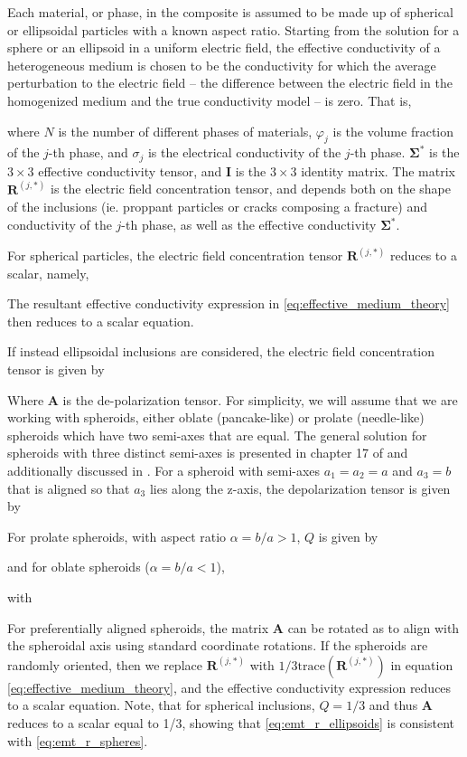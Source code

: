 Each material, or phase, in the composite is assumed to be made up of spherical or ellipsoidal particles with a known aspect ratio. Starting from the solution for a sphere or an ellipsoid in a uniform electric field, the effective conductivity of a heterogeneous medium is chosen to be the conductivity for which the average perturbation to the electric field -- the difference between the electric field in the homogenized medium and the true conductivity model -- is zero. That is,

where $N$ is the number of different phases of materials, $\varphi_j$ is the volume fraction of the $j$-th phase, and $\sigma_j$ is the electrical conductivity of the $j$-th phase. $\boldsymbol{\Sigma^*}$ is the $3 \times 3$ effective conductivity tensor, and $\mathbf{I}$ is the $3 \times 3$ identity matrix. The matrix $\mathbf{R}^{(j,*)}$ is the electric field concentration tensor, and depends both on the shape of the inclusions (ie. proppant particles or cracks composing a fracture) and conductivity of the $j$-th phase, as well as the effective conductivity $\boldsymbol{\Sigma^*}$.

For spherical particles, the electric field concentration tensor $\mathbf{R}^{(j,*)}$ reduces to a scalar, namely,

The resultant effective conductivity expression in \ref{eq:effective_medium_theory} then reduces to a scalar equation.

If instead ellipsoidal inclusions are considered, the electric field concentration tensor is given by

Where $\mathbf{A}$ is the de-polarization tensor. For simplicity, we will assume that we are working with spheroids, either oblate (pancake-like) or prolate (needle-like) spheroids which have two semi-axes that are equal. The general solution for spheroids with three distinct semi-axes is presented in chapter 17 of \cite{Torquato2002} and additionally discussed in \cite{Berryman2013}. For a spheroid with semi-axes $a_1 = a_2 = a$ and $a_3 = b$ that is aligned so that $a_3$ lies along the z-axis, the depolarization tensor is given by

For prolate spheroids, with aspect ratio $\alpha = b/a > 1$, $Q$ is given by

and for oblate spheroids ($\alpha = b/a < 1$),

with

For preferentially aligned spheroids, the matrix $\mathbf{A}$ can be rotated as to align with the spheroidal axis using standard coordinate rotations. If the spheroids are randomly oriented, then we replace $\mathbf{R}^{(j,*)}$ with $1/3\text{trace}(\mathbf{R}^{(j,*)})$ in equation \ref{eq:effective_medium_theory}, and the effective conductivity expression reduces to a scalar equation. Note, that for spherical inclusions, $Q = 1/3$ and thus $\mathbf{A}$ reduces to a scalar equal to 1/3, showing that \ref{eq:emt_r_ellipsoids} is consistent with \ref{eq:emt_r_spheres}.

